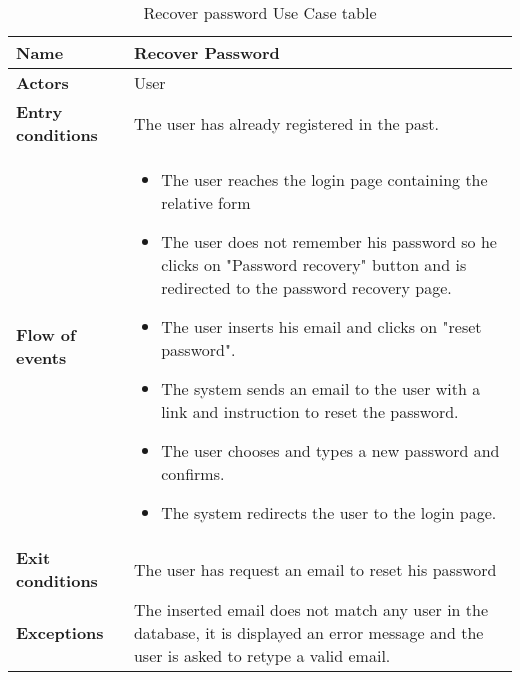 \begin{table}[!htbp]
	\centering
	\begin{tabular}{lp{8cm}}
		\bf\large Name&\bf\large Recover Password \\
		\hline
		\hline
		\bf Actors&User\\
		\hline
		\bf Entry conditions&The user has already registered in the past.\\
		\hline
		\bf Flow of events&
		\begin{itemize}
			\item The user reaches the login page containing the relative form
			\item The user does not remember his password so he clicks on "Password recovery" button and is redirected to the password recovery page.
			\item The user inserts his email and clicks on "reset password".
			\item The system sends an email to the user with a link and instruction to reset the password.
			\item The user chooses and types a new password and confirms.
			\item The system redirects the user to the login page.
		\end{itemize}
		\\
		\hline
		\bf Exit conditions&The user has request an email to reset his password \\
		\hline
		\bf Exceptions&The inserted email does not match any user in the database, it is displayed an error message and the user is asked to retype a valid email.\\
		\hline
		
	\end{tabular}
	\caption{Recover password Use Case table} \label{tab:recoverpassword}
\end{table}
